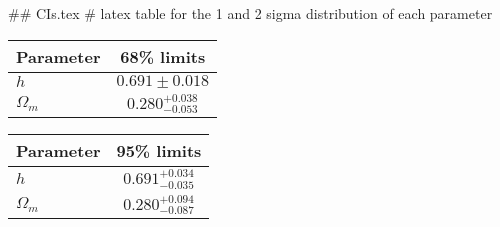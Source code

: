 ## CIs.tex
# latex table for the 1 and 2 sigma distribution of each parameter

\begin{tabular} { l  c}
 Parameter &  68\% limits\\
\hline
{\boldmath$h              $} & $0.691\pm 0.018            $\\
{\boldmath$\Omega_m       $} & $0.280^{+0.038}_{-0.053}   $\\
\hline
\end{tabular}

\begin{tabular} { l  c}
 Parameter &  95\% limits\\
\hline
{\boldmath$h              $} & $0.691^{+0.034}_{-0.035}   $\\
{\boldmath$\Omega_m       $} & $0.280^{+0.094}_{-0.087}   $\\
\hline
\end{tabular}
